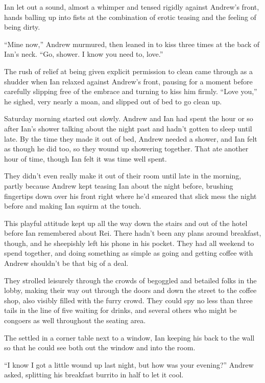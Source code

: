Ian let out a sound, almost a whimper and tensed rigidly against Andrew's front, hands balling up into fists at the combination of erotic teasing and the feeling of being dirty.

``Mine now,'' Andrew murmured, then leaned in to kiss three times at the back of Ian's neck. ``Go, shower. I know you need to, love.''

The rush of relief at being given explicit permission to clean came through as a shudder when Ian relaxed against Andrew's front, pausing for a moment before carefully slipping free of the embrace and turning to kiss him firmly. ``Love you,'' he sighed, very nearly a moan, and slipped out of bed to go clean up.

\secdiv{}

Saturday morning started out slowly. Andrew and Ian had spent the hour or so after Ian's shower talking about the night past and hadn't gotten to sleep until late. By the time they made it out of bed, Andrew needed a shower, and Ian felt as though he did too, so they wound up showering together. That ate another hour of time, though Ian felt it was time well spent.

They didn't even really make it out of their room until late in the morning, partly because Andrew kept teasing Ian about the night before, brushing fingertips down over his front right where he'd smeared that slick mess the night before and making Ian squirm at the touch.

This playful attitude kept up all the way down the stairs and out of the hotel before Ian remembered about Rei. There hadn't been any plans around breakfast, though, and he sheepishly left his phone in his pocket. They had all weekend to spend together, and doing something as simple as going and getting coffee with Andrew shouldn't be that big of a deal.

They strolled leisurely through the crowds of begoggled and betailed folks in the lobby, making their way out through the doors and down the street to the coffee shop, also visibly filled with the furry crowd. They could spy no less than three tails in the line of five waiting for drinks, and several others who might be congoers as well throughout the seating area.

The settled in a corner table next to a window, Ian keeping his back to the wall so that he could see both out the window and into the room.

``I know I got a little wound up last night, but how was your evening?'' Andrew asked, splitting his breakfast burrito in half to let it cool.

